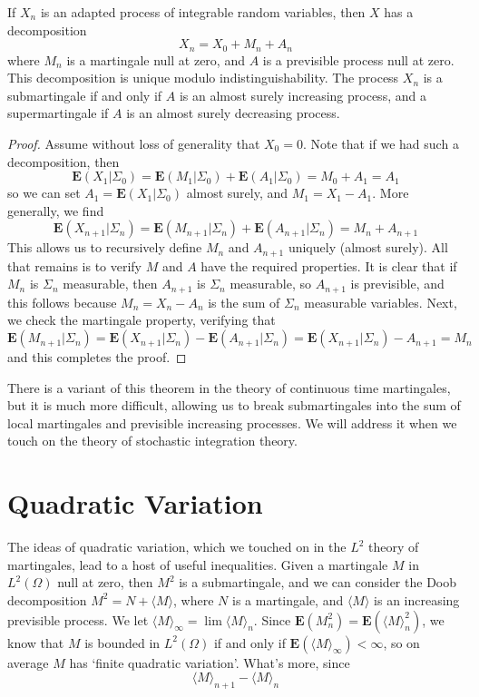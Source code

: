 \begin{theorem}
    If $X_n$ is an adapted process of integrable random variables, then $X$ has a decomposition
    \[ X_n = X_0 + M_n + A_n \]
    where $M_n$ is a martingale null at zero, and $A$ is a previsible process null at zero. This decomposition is unique modulo indistinguishability. The process $X_n$ is a submartingale if and only if $A$ is an almost surely increasing process, and a supermartingale if $A$ is an almost surely decreasing process.
\end{theorem}
\begin{proof}
    Assume without loss of generality that $X_0 = 0$. Note that if we had such a decomposition, then
    \[ \mathbf{E}(X_1|\Sigma_0) = \mathbf{E}(M_1|\Sigma_0) + \mathbf{E}(A_1|\Sigma_0) = M_0 + A_1 = A_1 \]
    so we can set $A_1 = \mathbf{E}(X_1|\Sigma_0)$ almost surely, and $M_1 = X_1 - A_1$. More generally, we find
    \[ \mathbf{E}(X_{n+1}|\Sigma_n) = \mathbf{E}(M_{n+1}|\Sigma_n) + \mathbf{E}(A_{n+1}|\Sigma_n) = M_n + A_{n+1} \]
    This allows us to recursively define $M_n$ and $A_{n+1}$ uniquely (almost surely). All that remains is to verify $M$ and $A$ have the required properties. It is clear that if $M_n$ is $\Sigma_n$ measurable, then $A_{n+1}$ is $\Sigma_n$ measurable, so $A_{n+1}$ is previsible, and this follows because $M_n = X_n - A_n$ is the sum of $\Sigma_n$ measurable variables. Next, we check the martingale property, verifying that
    \[ \mathbf{E}(M_{n+1}|\Sigma_n) = \mathbf{E}(X_{n+1}|\Sigma_n) - \mathbf{E}(A_{n+1}|\Sigma_n) = \mathbf{E}(X_{n+1}|\Sigma_n) - A_{n+1} = M_n \]
    and this completes the proof.
\end{proof}

There is a variant of this theorem in the theory of continuous time martingales, but it is much more difficult, allowing us to break submartingales into the sum of local martingales and previsible increasing processes. We will address it when we touch on the theory of stochastic integration theory.

\section{Quadratic Variation}

The ideas of quadratic variation, which we touched on in the $L^2$ theory of martingales, lead to a host of useful inequalities. Given a martingale $M$ in $L^2(\Omega)$ null at zero, then $M^2$ is a submartingale, and we can consider the Doob decomposition $M^2 = N + \langle M \rangle$, where $N$ is a martingale, and $\langle M \rangle$ is an increasing previsible process. We let $\langle M \rangle_\infty = \lim \langle M \rangle_n$. Since $\mathbf{E}(M_n^2) = \mathbf{E}(\langle M \rangle_n^2)$, we know that $M$ is bounded in $L^2(\Omega)$ if and only if $\mathbf{E}(\langle M \rangle_\infty) < \infty$, so on average $M$ has `finite quadratic variation'. What's more, since
%
\[ \langle M \rangle_{n+1} - \langle M \rangle_n \]

